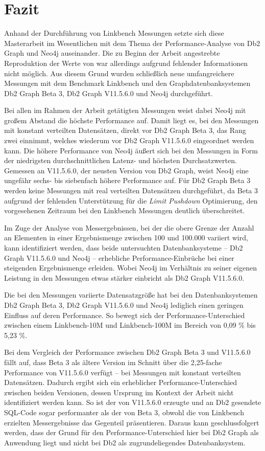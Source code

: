 \chapter{Fazit}
\label{fazit}
Anhand der Durchführung von Linkbench Messungen setzte sich diese Masterarbeit im Wesentlichen mit dem Thema der Performance-Analyse von Db2 Graph und Neo4j auseinander. Die zu Beginn der Arbeit angestrebte Reproduktion der Werte von  war allerdings aufgrund fehlender Informationen nicht möglich. Aus diesem Grund wurden schließlich neue umfangreichere Messungen mit dem Benchmark Linkbench und den Graphdatenbanksystemen Db2 Graph Beta 3, Db2 Graph V11.5.6.0 und Neo4j durchgeführt. 

Bei allen im Rahmen der Arbeit getätigten Messungen weist dabei Neo4j mit großem Abstand die höchste Performance auf. Damit liegt es, bei den Messungen mit konstant verteilten Datensätzen, direkt vor Db2 Graph Beta 3, das Rang zwei einnimmt, welches wiederum vor Db2 Graph V11.5.6.0 eingeordnet werden kann. Die höhere Performance von Neo4j äußert sich bei den Messungen in Form der niedrigsten durchschnittlichen Latenz- und höchsten Durchsatzwerten. Gemessen an V11.5.6.0, der neusten Version von Db2 Graph, weist Neo4j eine ungefähr sechs- bis siebenfach höhere Performance auf. Für Db2 Graph Beta 3 werden keine Messungen mit real verteilten Datensätzen durchgeführt, da Beta 3 aufgrund der fehlenden Unterstützung für die \textit{Limit Pushdown} Optimierung, den vorgesehenen Zeitraum bei den Linkbench Messungen deutlich überschreitet.

Im Zuge der Analyse von Messergebnissen, bei der die obere Grenze der Anzahl an Elementen in einer Ergebnismenge zwischen 100 und 100.000 variiert wird, kann identifiziert werden, dass beide  untersuchten Datenbanksysteme -- Db2 Graph V11.5.6.0 und Neo4j -- erhebliche Performance-Einbrüche bei einer steigenden Ergebnismenge erleiden. Wobei Neo4j im Verhältnis zu seiner eigenen Leistung in den Messungen etwas stärker einbricht als Db2 Graph V11.5.6.0. 

Die bei den Messungen variierte Datensatzgröße hat bei den Datenbanksystemen Db2 Graph Beta 3, Db2 Graph V11.5.6.0 und Neo4j lediglich einen geringen Einfluss auf deren Performance. So bewegt sich der Performance-Unterschied zwischen einem Linkbench-10M und Linkbench-100M im Bereich von 0,09 \% bis 5,23 \%.

Bei dem Vergleich der Performance zwischen Db2 Graph Beta 3 und V11.5.6.0 fällt auf, dass Beta 3 als ältere Version im Schnitt über die 2,25-fache Performance von V11.5.6.0 verfügt -- bei Messungen mit konstant verteilten Datensätzen. Dadurch ergibt sich ein erheblicher Performance-Unterschied zwischen beiden Versionen, dessen Ursprung im Kontext der Arbeit nicht identifiziert werden kann. So ist der von V11.5.6.0 erzeugte und an Db2 gesendete SQL-Code sogar performanter als der von Beta 3, obwohl die von Linkbench erzielten Messergebnisse das Gegenteil präsentieren. Daraus kann geschlussfolgert werden, dass der Grund für den Performance-Unterschied hier bei Db2 Graph als Anwendung liegt und nicht bei Db2 als zugrundeliegendes Datenbanksystem.

